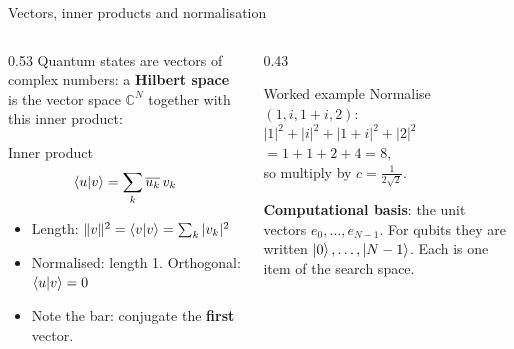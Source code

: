 \documentclass[aspectratio=169,11pt]{beamer}
\newcommand{\hl}[1]{{\color{qorange}\textbf{#1}}}
\newcommand{\key}[1]{{\color{qdark}\textbf{#1}}}
\begin{document}
\begin{frame}{Vectors, inner products and normalisation}
  \begin{columns}[T]
    \begin{column}{0.53\textwidth}
      Quantum states are vectors of complex numbers: a \key{Hilbert space} is the vector space $\mathbb{C}^N$ together with this inner product:
      \begin{block}{Inner product}
        \[ \braket{u|v} = \sum_k\overline{u_k}\,v_k \]
      \end{block}
      \begin{itemize}
        \item Length: $\|v\|^2 = \braket{v|v} = \sum_k|v_k|^2$
        \item Normalised: length 1. Orthogonal: $\braket{u|v} = 0$
        \item Note the bar: conjugate the \hl{first} vector.
      \end{itemize}
    \end{column}
    \begin{column}{0.43\textwidth}
      \begin{exampleblock}{Worked example}
        Normalise $(1, i, 1 + i, 2)$:\\[1mm]
        $|1|^2 + |i|^2 + |1 + i|^2 + |2|^2$\\
        $= 1 + 1 + 2 + 4 = 8$,\\[1mm]
        so multiply by $c = \frac{1}{2\sqrt2}$.
      \end{exampleblock}
      \vspace{1mm}
      \small \key{Computational basis}: the unit vectors $e_0, \dots, e_{N-1}$. For qubits they are written $\ket{0}, \dots, \ket{N-1}$. Each is one item of the search space.
    \end{column}
  \end{columns}
\end{frame}
\end{document}
